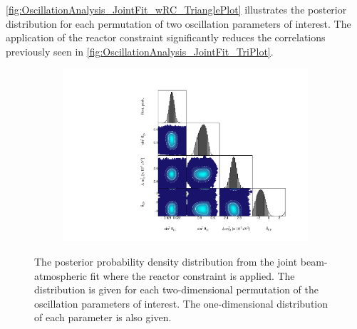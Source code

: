 \autoref{fig:OscillationAnalysis_JointFit_wRC_TrianglePlot} illustrates the posterior distribution for each permutation of two oscillation parameters of interest. The application of the reactor constraint significantly reduces the correlations previously seen in \autoref{fig:OscillationAnalysis_JointFit_TriPlot}.

\begin{figure}[h]
  \begin{subfigure}[t]{0.98\textwidth}
    \includegraphics[width=\textwidth, trim={0mm 0mm 0mm 0mm}, clip,page=1]{Figures/OA/JointFit_wRC/Contours_1D_wRC_UnSmeared_CredibleInterval_TrianglePlot.pdf}
  \end{subfigure}
  \caption{The posterior probability density distribution from the joint beam-atmospheric fit where the reactor constraint is applied. The distribution is given for each two-dimensional permutation of the oscillation parameters of interest. The one-dimensional distribution of each parameter is also given.}
  \label{fig:OscillationAnalysis_JointFit_wRC_TrianglePlot}
\end{figure}

